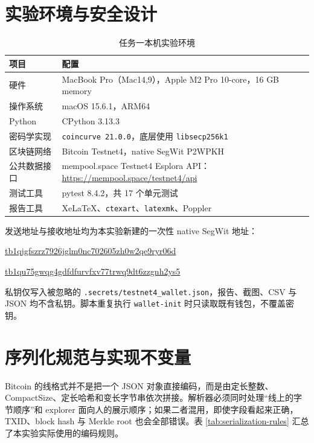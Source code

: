 \documentclass[11pt,a4paper,fontset=none]{ctexart}
\begin{document}
\section{实验环境与安全设计}

\begin{table}[H]
\centering
\caption{任务一本机实验环境}
\label{tab:task1-environment}
\begin{tabular}{p{}p{}}
\toprule
项目 & 配置 \\
\midrule
硬件 & MacBook Pro（Mac14,9），Apple M2 Pro 10-core，16 GB memory \\
操作系统 & macOS 15.6.1，ARM64 \\
Python & CPython 3.13.3 \\
密码学实现 & \texttt{coincurve 21.0.0}，底层使用 \texttt{libsecp256k1} \\
区块链网络 & Bitcoin Testnet4，native SegWit P2WPKH \\
公共数据接口 & mempool.space Testnet4 Esplora API：\url{https://mempool.space/testnet4/api} \\
测试工具 & pytest 8.4.2，共 17 个单元测试 \\
报告工具 & XeLaTeX、\texttt{ctexart}、\texttt{latexmk}、Poppler \\
\bottomrule
\end{tabular}
\end{table}

发送地址与接收地址均为本实验新建的一次性 native SegWit 地址：

\begin{description}[style=nextline]
  \item[Sender] \url{tb1qjgfszrz7926jglm0nc702605zh0w2qe9ryr06d}
  \item[Receiver] \url{tb1qu75gwqg4gdfdfurvfxv77trwq9dt6zzgnh2ys5}
\end{description}

私钥仅写入被忽略的 \texttt{.secrets/testnet4\_wallet.json}，报告、截图、CSV 与 JSON 均不含私钥。脚本重复执行 \texttt{wallet-init} 时只读取既有钱包，不覆盖密钥。

\section{序列化规范与实现不变量}

Bitcoin 的线格式并不是把一个 JSON 对象直接编码，而是由定长整数、CompactSize、定长哈希和变长字节串依次拼接。解析器必须同时处理“线上的字节顺序”和 explorer 面向人的展示顺序；如果二者混用，即使字段看起来正确，TXID、block hash 与 Merkle root 也会全部错误。表 \ref{tab:serialization-rules} 汇总了本实验实际使用的编码规则。
\end{document}
